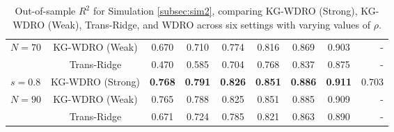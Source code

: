 \documentclass[12pt]{article}
\begin{document}
\begin{table}[H]
\begin{center}
\begin{small}
\begin{sc}
\begin{tabular}{l|c|cccccc|r}
$N=70$    & KG-WDRO (Weak) & 0.670 & 0.710 & 0.774 & 0.816 & 0.869 & 0.903 & -\\
          & Trans-Ridge & 0.470 & 0.585 & 0.704 & 0.768 & 0.837 & 0.875 & -\\
\midrule
$s = 0.8$ & KG-WDRO (Strong) & \textbf{0.768} & \textbf{0.791} & \textbf{0.826} & \textbf{0.851} & \textbf{0.886} & \textbf{0.911} & 0.703\\
$N=90$    & KG-WDRO (Weak) & 0.765 & 0.788 & 0.825 & 0.851 & 0.885 & 0.909 & -\\
          & Trans-Ridge & 0.671 & 0.724 & 0.785 & 0.821 & 0.863 & 0.890 & -\\
\bottomrule
\end{tabular}
\end{sc}
\end{small}
\end{center}
\caption{Out-of-sample $R^2$ for Simulation \ref{subsec:sim2}, comparing KG-WDRO (Strong), KG-WDRO (Weak), Trans-Ridge, and WDRO across six settings with varying values of $\rho$.}
\label{tab:sim2}
\end{table}
\newpage
\end{document}
